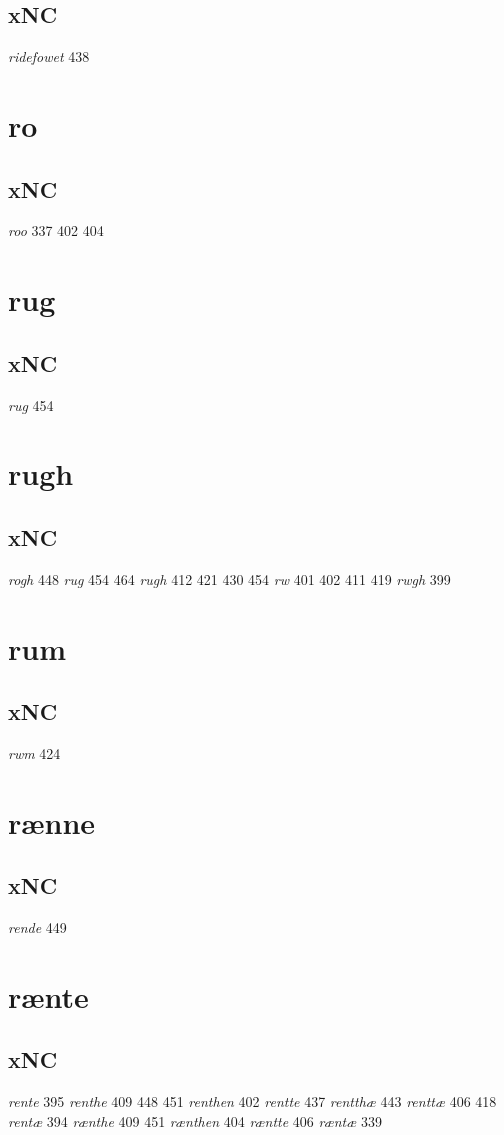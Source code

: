 \documentclass[a4paper,twocolumn]{article}
\begin{document}
\subsection{xNC}
\label{sec:org84e26cd}
\emph{ridefowet} 438 
\section{ro}
\label{sec:orgfab847a}
\subsection{xNC}
\label{sec:org4589b16}
\emph{roo} 337 402 404 
\section{rug}
\label{sec:orgc0dbbc5}
\subsection{xNC}
\label{sec:org1ddef65}
\emph{rug} 454 
\section{rugh}
\label{sec:org403b518}
\subsection{xNC}
\label{sec:org4316eb0}
\emph{rogh} 448 \emph{rug} 454 464 \emph{rugh} 412 421 430 454 \emph{rw} 401 402 411 419 \emph{rwgh} 399 
\section{rum}
\label{sec:org17ab65a}
\subsection{xNC}
\label{sec:orgdac3186}
\emph{rwm} 424 
\section{rænne}
\label{sec:org23a4565}
\subsection{xNC}
\label{sec:orgbd1a4f9}
\emph{rende} 449 
\section{rænte}
\label{sec:org9be871c}
\subsection{xNC}
\label{sec:org57eae72}
\emph{rente} 395 \emph{renthe} 409 448 451 \emph{renthen} 402 \emph{rentte} 437 \emph{rentthæ} 443 \emph{renttæ} 406 418 \emph{rentæ} 394 \emph{rænthe} 409 451 \emph{rænthen} 404 \emph{ræntte} 406 \emph{ræntæ} 339 
\end{document}
